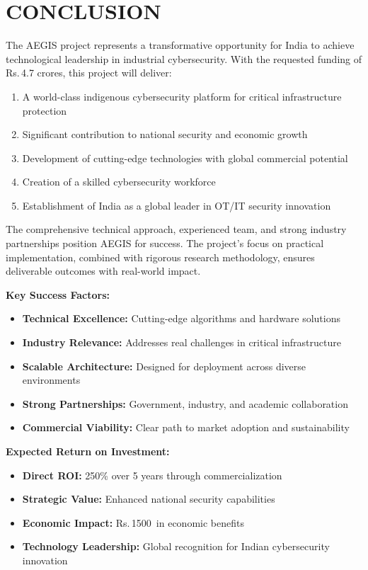 \documentclass[12pt,a4paper]{article}
\newcommand{\rupees}{Rs.\,}
\newcommand{\crores}{\text{ Crores}}
\begin{document}
\newpage

\section{CONCLUSION}

The AEGIS project represents a transformative opportunity for India to achieve technological leadership in industrial cybersecurity. With the requested funding of \rupees 4.7 crores, this project will deliver:

\begin{enumerate}
    \item A world-class indigenous cybersecurity platform for critical infrastructure protection
    \item Significant contribution to national security and economic growth
    \item Development of cutting-edge technologies with global commercial potential
    \item Creation of a skilled cybersecurity workforce
    \item Establishment of India as a global leader in OT/IT security innovation
\end{enumerate}

The comprehensive technical approach, experienced team, and strong industry partnerships position AEGIS for success. The project's focus on practical implementation, combined with rigorous research methodology, ensures deliverable outcomes with real-world impact.

\textbf{Key Success Factors:}
\begin{itemize}
    \item \textbf{Technical Excellence:} Cutting-edge algorithms and hardware solutions
    \item \textbf{Industry Relevance:} Addresses real challenges in critical infrastructure
    \item \textbf{Scalable Architecture:} Designed for deployment across diverse environments
    \item \textbf{Strong Partnerships:} Government, industry, and academic collaboration
    \item \textbf{Commercial Viability:} Clear path to market adoption and sustainability
\end{itemize}

\textbf{Expected Return on Investment:}
\begin{itemize}
    \item \textbf{Direct ROI:} 250\% over 5 years through commercialization
    \item \textbf{Strategic Value:} Enhanced national security capabilities
    \item \textbf{Economic Impact:} \rupees 1500\crores\ in economic benefits
    \item \textbf{Technology Leadership:} Global recognition for Indian cybersecurity innovation
\end{itemize}
\end{document}
